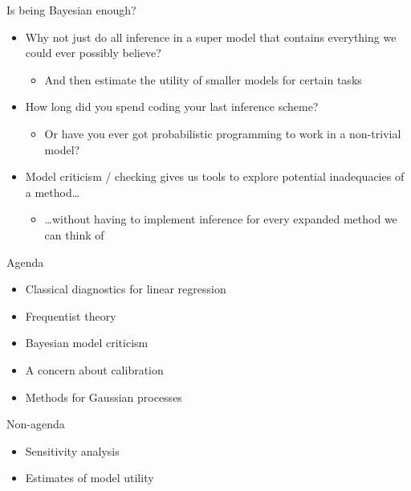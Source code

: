 \begin{frame}{Is being Bayesian enough?}
  \begin{itemize}
    \item Why not just do all inference in a super model that contains everything we could ever possibly believe?
    \pause
    \begin{itemize}
      \item And then \eg estimate the utility of smaller models for certain tasks
    \end{itemize}
    \vspace{\baselineskip}
    \pause
    \item How long did you spend coding your last inference scheme?
    \begin{itemize}
      \item Or have you ever got probabilistic programming to work in a non-trivial model?
    \end{itemize}
    \vspace{\baselineskip}
    \pause
    \item Model criticism / checking gives us tools to explore potential inadequacies of a method\dots
    \begin{itemize}
       \item \dots without having to implement inference for every expanded method we can think of
     \end{itemize}
  \end{itemize}
\end{frame}

\begin{frame}{Agenda}
  \begin{itemize}
    \item Classical diagnostics for linear regression
    \vspace{\baselineskip}
    \item Frequentist theory
    \vspace{\baselineskip}
    \item Bayesian model criticism
    \vspace{\baselineskip}
    \item A concern about calibration
    \vspace{\baselineskip}
    \item Methods for Gaussian processes
  \end{itemize}
\end{frame}

\begin{frame}{Non-agenda}
  \begin{itemize}
    \item Sensitivity analysis
    \vspace{\baselineskip}
    \item Estimates of model utility
  \end{itemize}
\end{frame}

